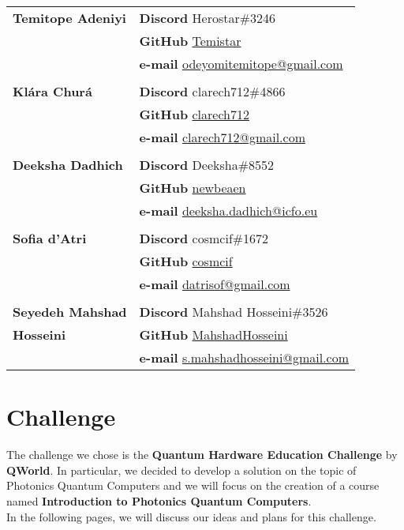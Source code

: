 \documentclass[hidelinks, a4paper,12pt]{article}
\begin{document}
\begin{tabular}{p{.275\linewidth} p{.65\linewidth}}
\textbf{Temitope Adeniyi} &\textbf{Discord} Herostar\#3246\\[.3em]
                        &\textbf{GitHub} \href{https://github.com/Temistar}{Temistar}\\[.3em]
                        &\textbf{e-mail} \href{mailto:odeyomitemitope@gmail.com}{odeyomitemitope@gmail.com}\\[.5em]
\\
\textbf{Klára Churá} &\textbf{Discord} clarech712\#4866\\[.3em]
                        &\textbf{GitHub} \href{https://github.com/clarech712}{clarech712}\\[.3em]
                        &\textbf{e-mail} \href{mailto:clarech712@gmail.com}{clarech712@gmail.com}\\[.5em]
\\
\textbf{Deeksha Dadhich} &\textbf{Discord} Deeksha\#8552\\[.3em]
                        &\textbf{GitHub} \href{https://github.com/newbeaen}{newbeaen}\\[.3em]
                        &\textbf{e-mail} \href{mailto:deeksha.dadhich@icfo.eu}{deeksha.dadhich@icfo.eu}\\[.5em]
\\
\textbf{Sofia d'Atri} &\textbf{Discord} cosmcif\#1672\\[.3em]
                        &\textbf{GitHub} \href{https://github.com/cosmcif}{cosmcif}\\[.3em]
                        &\textbf{e-mail} \href{mailto:datrisof@gmail.com}{datrisof@gmail.com}\\[.5em]
\\
\textbf{Seyedeh Mahshad} &\textbf{Discord} Mahshad Hosseini\#3526\\[.3em]
\textbf{Hosseini} &\textbf{GitHub} \href{https://github.com/MahshadHosseini}{MahshadHosseini}\\[.3em]
                        &\textbf{e-mail} \href{mailto:s.mahshadhosseini@gmail.com}{s.mahshadhosseini@gmail.com}\\[.5em]
\end{tabular}

\section{Challenge}
The challenge we chose is the \textbf{Quantum Hardware Education Challenge} by \textbf{QWorld}. In particular, we decided to develop a solution on the topic of Photonics Quantum Computers and we will focus on the creation of a course named \textbf{Introduction to Photonics Quantum Computers}.\\In the following pages, we will discuss our ideas and plans for this challenge.
\end{document}
